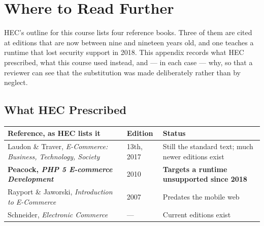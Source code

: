 \chapter{Where to Read Further}\label{app:resources}
\normalfigures

HEC's outline for this course lists four reference books. Three of them are
cited at editions that are now between nine and nineteen years old, and one
teaches a runtime that lost security support in 2018. This appendix records
what HEC prescribed, what this course used instead, and --- in each case ---
why, so that a reviewer can see that the substitution was made deliberately
rather than by neglect.

\section{What HEC Prescribed}

\begin{longtable}{@{}L{6.4cm}L{2.2cm}L{5.8cm}@{}}
\toprule
{}
\textbf{Reference, as HEC lists it} & \textbf{Edition} & \textbf{Status} \\
\midrule
\endhead
Laudon \& Traver, \emph{E-Commerce: Business, Technology, Society} & 13th,
2017 & Still the standard text; much newer editions exist \\
\textbf{Peacock, \emph{PHP 5 E-commerce Development}} & 2010 & \textbf{Targets
a runtime unsupported since 2018} \\
Rayport \& Jaworski, \emph{Introduction to E-Commerce} & 2007 & Predates the
mobile web \\
Schneider, \emph{Electronic Commerce} & --- & Current editions exist \\
\bottomrule
\end{longtable}

